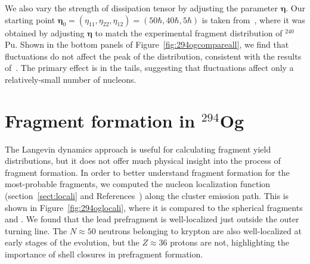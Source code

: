 We also vary the strength of dissipation tensor by adjusting the parameter $\mathbf{\eta}$. Our starting point $\mathbf{\eta}_0 = (\eta_{11},\eta_{22},\eta_{12}) = (50\hbar,40\hbar,5\hbar)$ is taken from~\cite{Sadhukhan2016}, where it was obtained by adjusting $\mathbf{\eta}$ to match the experimental fragment distribution of $^{240}$Pu. Shown in the bottom panels of Figure~\ref{fig:294ogcompareall}, we find that fluctuations do not affect the peak of the distribution, consistent with the results of~\cite{Randrup2011,Sierk2017,Sadhukhan2017}. The primary effect is in the tails, suggesting that fluctuations affect only a relatively-small number of nucleons.

\section{Fragment formation in $^{294}$Og}\label{sect:294Ogfrags}

The Langevin dynamics approach is useful for calculating fragment yield distributions, but it does not offer much physical insight into the process of fragment formation. In order to better understand fragment formation for the most-probable fragments, we computed the nucleon localization function (section~\ref{sect:locali} and References~\cite{Zhang2016,Sadhukhan2017}) along the cluster emission path. This is shown in Figure~\ref{fig:294oglocali}, where it is compared to the spherical fragments {\Pb} and {\Kr}. We found that the lead prefragment is well-localized just outside the outer turning line. The $N\approx50$ neutrons belonging to krypton are also well-localized at early stages of the evolution, but the $Z\approx36$ protons are not, highlighting the importance of shell closures in prefragment formation.


